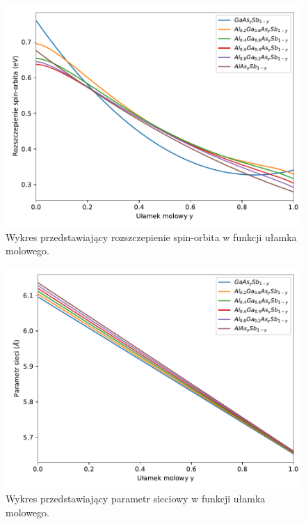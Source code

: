 \documentclass[12pt,openany,a4paper]{book}
\begin{document}
\begin{figure}[H]
	\centering
	\includegraphics[width = 0.9\linewidth]{Figures/quaternary/quat_delta_so_x.pdf}
	\caption{Wykres przedstawiający rozszczepienie spin-orbita w funkcji ułamka 
	molowego.}\label{fig:quat_delta_so_x}
\end{figure}

\begin{figure}[H]
	\centering
	\includegraphics[width = 0.9\linewidth]{Figures/quaternary/quat_alc_x.pdf}
	\caption{Wykres przedstawiający parametr sieciowy w funkcji ułamka 
	molowego.}\label{fig:quat_alc_x}
\end{figure}
\end{document}
